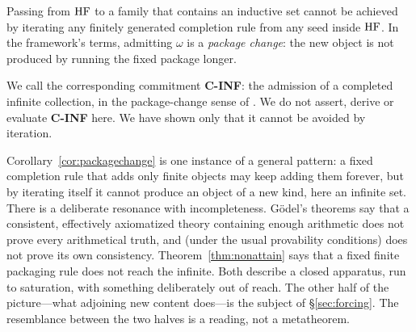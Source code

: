 \begin{corollary}\label{cor:packagechange}
Passing from $\mathrm{HF}$ to a family that contains an inductive set cannot be achieved by iterating any
finitely generated completion rule from any seed inside $\mathrm{HF}$. In the framework's terms, admitting
$\omega$ is a \emph{package change}: the new object is not produced by running the fixed package
longer.
\end{corollary}

We call the corresponding commitment \textbf{C-INF}: the admission of a completed infinite
collection, in the package-change sense of \citet{SBTIncompleteness}. We do not assert, derive
or evaluate \textbf{C-INF} here. We have shown only that it cannot be avoided by iteration.

\begin{remark}\label{rem:saturation}
Corollary~\ref{cor:packagechange} is one instance of a general pattern: a fixed completion rule
that adds only finite objects may keep adding them forever, but by iterating itself it cannot
produce an object of a new kind, here an infinite set. There
is a deliberate resonance with incompleteness. G\"odel's theorems \citep{Godel1931} say that a
consistent, effectively axiomatized theory containing enough arithmetic does not prove every
arithmetical truth, and (under the usual provability conditions) does not prove its own
consistency. Theorem~\ref{thm:nonattain} says that a fixed finite packaging rule does not reach
the infinite. Both describe a closed apparatus, run to saturation, with something deliberately out
of reach. The other half of the picture---what adjoining new content does---is the subject of
\S\ref{sec:forcing}. The resemblance between the two halves is a reading, not a metatheorem.
\end{remark}

